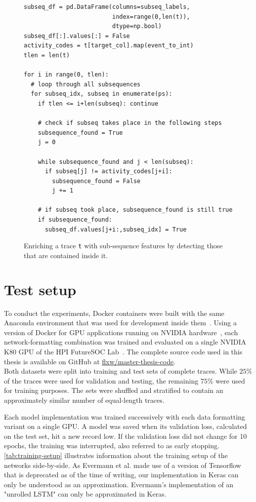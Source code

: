 \begin{figure}
\begin{verbatim}
subseq_df = pd.DataFrame(columns=subseq_labels,
                         index=range(0,len(t)),
                         dtype=np.bool)
subseq_df[:].values[:] = False
activity_codes = t[target_col].map(event_to_int)
tlen = len(t)

for i in range(0, tlen):
  # loop through all subsequences
  for subseq_idx, subseq in enumerate(ps):
    if tlen <= i+len(subseq): continue
            
    # check if subseq takes place in the following steps
    subsequence_found = True
    j = 0
    
    while subsequence_found and j < len(subseq):
      if subseq[j] != activity_codes[j+i]:
        subsequence_found = False
        j += 1

    # if subseq took place, subsequence_found is still true
    if subsequence_found:
      subseq_df.values[j+i:,subseq_idx] = True
\end{verbatim}
\caption{Enriching a trace \texttt{t} with sub-sequence features by detecting those that are contained inside it.}
\label{lst:subsequence-feature-creation}
\end{figure}

\section{Test setup}
\label{sec:eval:test-setup}
To conduct the experiments, Docker containers were built with the same Anaconda environment that was used for development inside them~\cite{web:docker}. Using a version of Docker for GPU applications running on NVIDIA hardware~\cite{web:nvidia-docker}, each network-formatting combination was trained and evaluated on a single NVIDIA K80 GPU of the HPI FutureSOC Lab~\cite{web:fsoc}. The complete source code used in this thesis is available on GitHub at \href{https://github.com/flxw/master-thesis-code}{flxw/master-thesis-code}.\\

Both datasets were split into training and test sets of complete traces. While $25\%$ of the traces were used for validation and testing, the remaining $75\%$ were used for training purposes. The sets were shuffled and stratified to contain an approximately similar number of equal-length traces.

Each model implementation was trained successively with each data formatting variant on a single GPU. A model was saved when its validation loss, calculated on the test set, hit a new record low. If the validation loss did not change for 10 epochs, the training was interrupted, also referred to as early stopping. \autoref{tab:training-setup} illustrates information about the training setup of the networks side-by-side. As Evermann et al. made use of a version of Tensorflow that is deprecated as of the time of writing, our implementation in Keras can only be understood as an approximation. Evermann's implementation of an "unrolled LSTM" can only be approximated in Keras.

